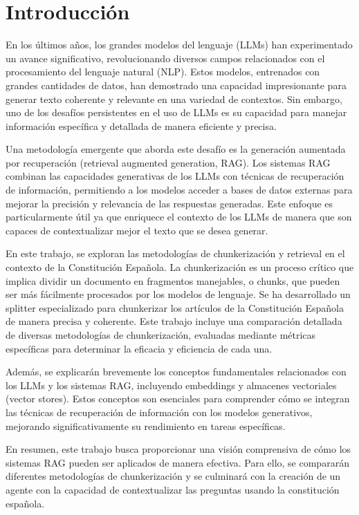 
\cleardoublepage

\chapter{Introducción}
\label{introduccion}

En los últimos años, los grandes modelos del lenguaje (LLMs) han experimentado un avance significativo, revolucionando diversos campos relacionados con el procesamiento del lenguaje natural (NLP). Estos modelos, entrenados con grandes cantidades de datos, han demostrado una capacidad impresionante para generar texto coherente y relevante en una variedad de contextos. Sin embargo, uno de los desafíos persistentes en el uso de LLMs es su capacidad para manejar información específica y detallada de manera eficiente y precisa.

Una metodología emergente que aborda este desafío es la generación aumentada por recuperación (retrieval augmented generation, RAG). Los sistemas RAG combinan las capacidades generativas de los LLMs con técnicas de recuperación de información, permitiendo a los modelos acceder a bases de datos externas para mejorar la precisión y relevancia de las respuestas generadas. Este enfoque es particularmente útil ya que enriquece el contexto de los LLMs de manera que son capaces de contextualizar mejor el texto que se desea generar.

En este trabajo, se exploran las metodologías de chunkerización y retrieval en el contexto de la Constitución Española. La chunkerización es un proceso crítico que implica dividir un documento en fragmentos manejables, o chunks, que pueden ser más fácilmente procesados por los modelos de lenguaje. Se ha desarrollado un splitter especializado para chunkerizar los artículos de la Constitución Española de manera precisa y coherente. Este trabajo incluye una comparación detallada de diversas metodologías de chunkerización, evaluadas mediante métricas específicas para determinar la eficacia y eficiencia de cada una.

Además, se explicarán brevemente los conceptos fundamentales relacionados con los LLMs y los sistemas RAG, incluyendo embeddings y almacenes vectoriales (vector stores). Estos conceptos son esenciales para comprender cómo se integran las técnicas de recuperación de información con los modelos generativos, mejorando significativamente su rendimiento en tareas específicas.

En resumen, este trabajo busca proporcionar una visión comprensiva de cómo los sistemas RAG pueden ser aplicados de manera efectiva. Para ello, se compararán diferentes metodologías de chunkerización y se culminará con la creación de un agente con la capacidad de contextualizar las preguntas usando la constitución española.

